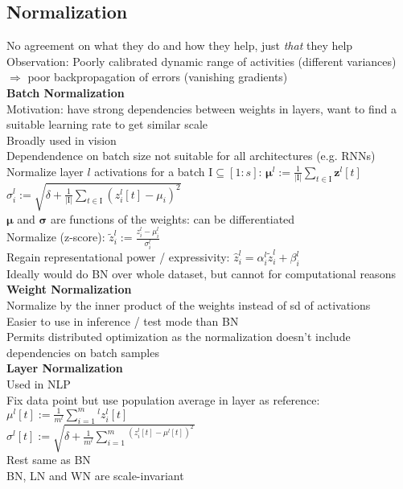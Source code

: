 \subsection*{Normalization}
No agreement on what they do and how they help, just \textit{that} they help\\
Observation: Poorly calibrated dynamic range of activities (different variances) $\Rightarrow$ poor backpropagation of errors (vanishing gradients)\\
\textbf{Batch Normalization}\\
Motivation: have strong dependencies between weights in layers, want to find a suitable learning rate to get similar scale\\
Broadly used in vision\\
Dependendence on batch size not suitable for all architectures (e.g. RNNs)\\
Normalize layer $l$ activations for a batch $\mathrm I \subseteq[1:s]$:
$\mathbf \mu^l:=\frac{1}{|\mathrm I|}\sum_{t\in\mathrm I}\mathbf z^l[t]$\\
$\sigma_i^l:=\sqrt{\delta +\frac{1}{|\mathrm I|}\sum_{t\in\mathrm I}(z_i^l[t]-\mu_i)^2}$\\
$\pmb \mu$ and $\pmb \sigma$ are functions of the weights: can be differentiated\\
Normalize (z-score): $\tilde z_i^l:=\frac{z_i^l-\mu_i^l}{\sigma_i^l}$\\
Regain representational power / expressivity: $\hat z_i^l=\alpha_i^l\tilde z_i^l+\beta_i^l$\\
Ideally would do BN over whole dataset, but cannot for computational reasons\\
\textbf{Weight Normalization}\\
Normalize by the inner product of the weights instead of sd of activations\\
Easier to use in inference / test mode than BN\\
Permits distributed optimization as the normalization doesn't include dependencies on batch samples\\
\textbf{Layer Normalization}\\
Used in NLP\\
Fix data point but use population average in layer as reference:\\
$\mu^l[t]:=\frac{1}{m^l}\sum_{i=1}^m^lz_i^l[t]$\\
$\sigma^l[t]:=\sqrt{\delta+\frac{1}{m^l}\sum_{i=1}^m^(z_i^l[t]-\mu^l[t])^2}$\\
Rest same as BN\\
BN, LN and WN are scale-invariant